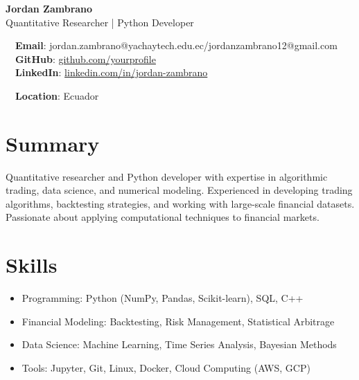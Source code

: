 \documentclass{article}
\begin{document}
\small %

\begin{center}
\huge
\textbf{Jordan Zambrano} \\
\normalsize
Quantitative Researcher | Python Developer \\
\end{center}

\begin{minipage}[ht]{0.6\linewidth}
	\faEnvelope~~\textbf{Email}: jordan.zambrano@yachaytech.edu.ec/jordanzambrano12@gmail.com \\
	\faGithub~~\textbf{GitHub}: \href{https://github.com/yourprofile}{github.com/yourprofile} \\
	\faLinkedin~~\textbf{LinkedIn}: \href{https://www.linkedin.com/in/jordan-zambrano}{linkedin.com/in/jordan-zambrano} \\
\end{minipage}
\begin{minipage}[ht]{0.4\linewidth}
	\faMapMarker~~\textbf{Location}: Ecuador \\
\end{minipage}

\section*{Summary}
Quantitative researcher and Python developer with expertise in algorithmic trading, data science, and numerical modeling. Experienced in developing trading algorithms, backtesting strategies, and working with large-scale financial datasets. Passionate about applying computational techniques to financial markets.

\section*{Skills}
\begin{itemize}
    \item Programming: Python (NumPy, Pandas, Scikit-learn), SQL, C++
    \item Financial Modeling: Backtesting, Risk Management, Statistical Arbitrage
    \item Data Science: Machine Learning, Time Series Analysis, Bayesian Methods
    \item Tools: Jupyter, Git, Linux, Docker, Cloud Computing (AWS, GCP)
\end{itemize}
\end{document}
